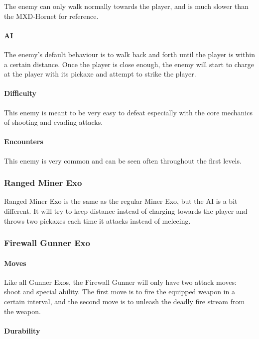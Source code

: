 \documentclass[12pt]{article}
\begin{document}
The enemy can only walk normally towards the player, and is much slower than the MXD-Hornet for reference.

\paragraph{AI}

The enemy's default behaviour is to walk back and forth until the player is within a certain distance. Once the player is close enough, the enemy will start to charge at the player with its pickaxe and attempt to strike the player.

\paragraph{Difficulty}

This enemy is meant to be very easy to defeat especially with the core mechanics of shooting and evading attacks. 

\paragraph{Encounters}

This enemy is very common and can be seen often throughout the first levels.

\subsubsection{Ranged Miner Exo}

Ranged Miner Exo is the same as the regular Miner Exo, but the AI is a bit different. It will try to keep distance instead of charging towards the player and throws two pickaxes each time it attacks instead of meleeing. 

\subsubsection{Firewall Gunner Exo}

\paragraph{Moves}

Like all Gunner Exos, the Firewall Gunner will only have two attack moves: shoot and special ability. The first move is to fire the equipped weapon in a certain interval, and the second move is to unleash the deadly fire stream from the weapon.

\paragraph{Durability}
\end{document}
